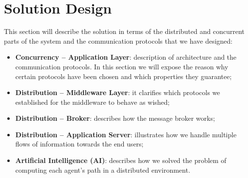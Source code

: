 \section{Solution Design}

This section will describe the solution in terms of the distributed and
concurrent parts of the system and the communication protocols that we have
designed:

\begin{itemize}
\item \textbf{Concurrency -- Application Layer}:
  description of architecture and the communication protocols.
  In this section we
  will expose the reason why certain protocols have been chosen and which
  properties they guarantee;
\item \textbf{Distribution -- Middleware Layer}:
  it clarifies which protocols
  we established for the middleware to behave as wished;
\item \textbf{Distribution -- Broker}:
  describes how the message broker works;
\item \textbf{Distribution -- Application Server}:
  illustrates how we handle multiple flows of information towards the end
  users;
\item \textbf{Artificial Intelligence (AI)}:
  describes how we solved the problem of computing each agent's path
  in a distributed environment.
\end{itemize}





